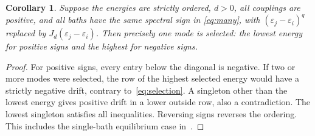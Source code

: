 \documentclass[11pt]{article}
\newtheorem{corollary}[theorem]{Corollary}
\begin{document}
\begin{corollary}\label{cor:sign}
Suppose the energies are strictly ordered, $d>0$, all couplings
are positive, and all baths have the same spectral sign in
\eqref{eq:many}, with $(\varepsilon_j-\varepsilon_i)^q$
replaced by $J_d(\varepsilon_j-\varepsilon_i)$.
Then precisely one mode is selected: the lowest energy for
positive signs and the highest for negative signs.
\end{corollary}
\begin{proof}
For positive signs, every entry below the diagonal is negative.
If two or more modes were selected, the row of the highest
selected energy would have a strictly negative drift, contrary
to~\eqref{eq:selection}. A singleton other than the lowest
energy gives positive drift in a lower outside row, also a
contradiction. The lowest singleton satisfies all inequalities.
Reversing signs reverses the ordering. This includes the
single-bath equilibrium case in~\cite[Sec.\ II, Eq.\ (12)]{ske}.
\end{proof}
\end{document}
